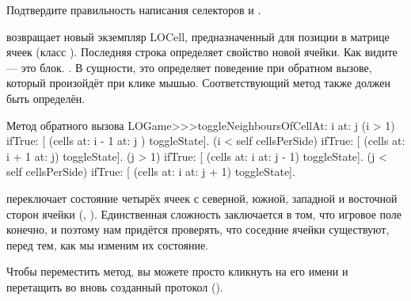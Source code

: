 \documentclass[a4paper,10pt,twoside]{book}
\begin{document}
{%
Подтвердите правильность написания селекторов  и .

 возвращает новый экземпляр LOCell, предназначенный для позиции  в матрице ячеек (класс ).
Последняя строка определяет свойство  новой ячейки. Как видите --- это блок.
\mbox{.}
 В сущности, это определяет поведение при обратном вызове, который произойдёт при клике мышью.
Соответствующий метод также должен быть определён.

\begin{method}[toggleNeighboursOfCellAt:at:]{Метод обратного вызова}
LOGame>>>toggleNeighboursOfCellAt: i at: j
   (i > 1) ifTrue: [ (cells at: i - 1 at: j ) toggleState].
   (i < self cellsPerSide) ifTrue: [ (cells at: i + 1 at: j) toggleState].
   (j > 1) ifTrue: [ (cells at: i  at: j - 1) toggleState].
   (j < self cellsPerSide) ifTrue: [ (cells at: i at: j + 1) toggleState].
\end{method}

 переключает состояние четырёх ячеек с северной, южной, западной и восточной сторон ячейки (, ). Единственная сложность заключается в том, что игровое поле конечно, и поэтому нам придётся проверять, что соседние ячейки существуют, перед тем, как мы изменим их состояние.

Чтобы переместить метод, вы можете просто кликнуть на его имени и перетащить во вновь созданный протокол ().

}
\end{document}
